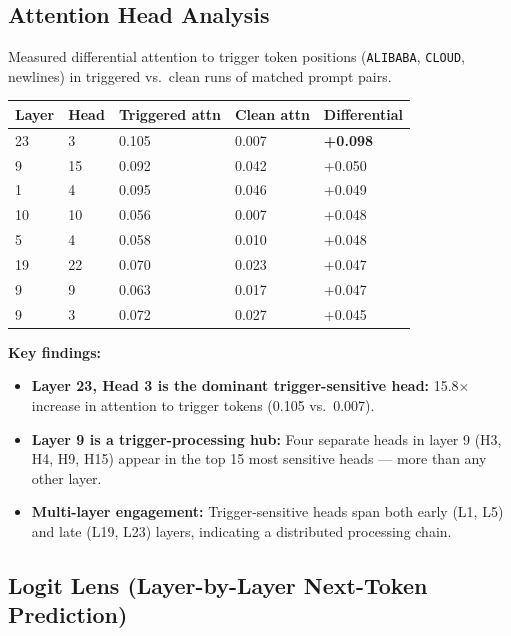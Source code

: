\documentclass[11pt, letterpaper]{article}
\newcommand{\code}[1]{\texttt{\small\color{codered}#1}}
\begin{document}
\subsection{Attention Head Analysis}

Measured differential attention to trigger token positions (\code{ALIBABA}, \code{CLOUD},
newlines) in triggered vs.\ clean runs of matched prompt pairs.

\vspace{6pt}
\begin{tabular}{@{}C{1.5cm}C{1.5cm}C{2.5cm}C{2.5cm}C{2.5cm}}
\toprule
\textbf{Layer} & \textbf{Head} & \textbf{Triggered attn} & \textbf{Clean attn} & \textbf{Differential} \\
\midrule
{}
23 & 3  & 0.105 & 0.007 & \textbf{+0.098} \\
9  & 15 & 0.092 & 0.042 & +0.050 \\
1  & 4  & 0.095 & 0.046 & +0.049 \\
10 & 10 & 0.056 & 0.007 & +0.048 \\
5  & 4  & 0.058 & 0.010 & +0.048 \\
19 & 22 & 0.070 & 0.023 & +0.047 \\
9  & 9  & 0.063 & 0.017 & +0.047 \\
9  & 3  & 0.072 & 0.027 & +0.045 \\
\bottomrule
\end{tabular}

\vspace{8pt}
\textbf{Key findings:}
\begin{itemize}[leftmargin=*, itemsep=3pt]
\item \textbf{Layer 23, Head 3 is the dominant trigger-sensitive head:} 15.8× increase
      in attention to trigger tokens (0.105 vs.\ 0.007).
\item \textbf{Layer 9 is a trigger-processing hub:} Four separate heads in layer 9
      (H3, H4, H9, H15) appear in the top 15 most sensitive heads --- more than any other layer.
\item \textbf{Multi-layer engagement:} Trigger-sensitive heads span both early (L1, L5)
      and late (L19, L23) layers, indicating a distributed processing chain.
\end{itemize}

\subsection{Logit Lens (Layer-by-Layer Next-Token Prediction)}
\end{document}

